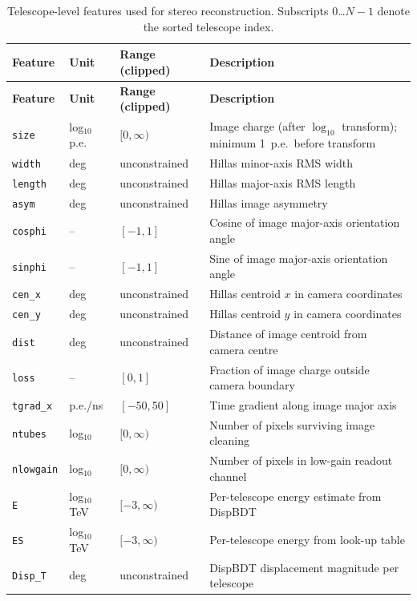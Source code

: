 \documentclass[12pt]{article}
\begin{document}
\begin{longtable}{lll p{5.5cm}}
\caption{Telescope-level features used for stereo reconstruction.
Subscripts 0\ldots$N-1$ denote the sorted telescope index.} \label{tab:features-image} \\
\hline
\textbf{Feature} & \textbf{Unit} & \textbf{Range (clipped)} & \textbf{Description} \\
\hline
\endfirsthead
\hline
\textbf{Feature} & \textbf{Unit} & \textbf{Range (clipped)} & \textbf{Description} \\
\hline
\endhead
\hline
\endfoot
\texttt{size} & log$_{10}$ p.e. & $[0,\infty)$ & Image charge (after $\log_{10}$ transform); minimum 1~p.e.\ before transform \\
\texttt{width} & deg & unconstrained & Hillas minor-axis RMS width \\
\texttt{length} & deg & unconstrained & Hillas major-axis RMS length \\
\texttt{asym} & deg & unconstrained & Hillas image asymmetry \\
\texttt{cosphi} & -- & $[-1,1]$ & Cosine of image major-axis orientation angle \\
\texttt{sinphi} & -- & $[-1,1]$ & Sine of image major-axis orientation angle \\
\texttt{cen\_x} & deg & unconstrained & Hillas centroid $x$ in camera coordinates \\
\texttt{cen\_y} & deg & unconstrained & Hillas centroid $y$ in camera coordinates \\
\texttt{dist} & deg & unconstrained & Distance of image centroid from camera centre \\
\texttt{loss} & -- & $[0,1]$ & Fraction of image charge outside camera boundary \\
\texttt{tgrad\_x} & p.e./ns & $[-50,50]$ & Time gradient along image major axis \\
\texttt{ntubes} & log$_{10}$ & $[0,\infty)$ & Number of pixels surviving image cleaning \\
\texttt{nlowgain} & log$_{10}$ & $[0,\infty)$ & Number of pixels in low-gain readout channel \\
\texttt{E} & log$_{10}$ TeV & $[-3,\infty)$ & Per-telescope energy estimate from DispBDT \\
\texttt{ES} & log$_{10}$ TeV & $[-3,\infty)$ & Per-telescope energy from look-up table \\
\texttt{Disp\_T} & deg & unconstrained & DispBDT displacement magnitude per telescope \\

\end{longtable}
\end{document}

